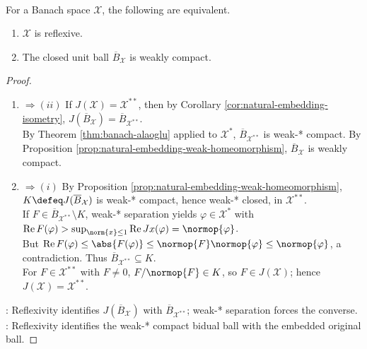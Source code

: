 \begin{theorem} \label{thm:kakutani-reflexivity-weak-compactness} \\
For a Banach space $\mathcal{X}$, the following are equivalent.
\begin{enumerate}[label=(\roman*)]
\setlength{\itemsep}{0pt}
\item $\mathcal{X}$ is reflexive.
\item The closed unit ball $\overline{B}_{\mathcal{X}}$ is weakly compact.
\end{enumerate}
\begin{proof}
\begin{enumerate}[label=\roman*.]
\setlength{\itemsep}{0pt}
\item[$(i)$]$\Rightarrow(ii)$ If $J(\mathcal X)=\mathcal X^{**}$, then by Corollary \ref{cor:natural-embedding-isometry}, $J(\overline{B}_{\mathcal X})=\overline{B}_{\mathcal X^{**}}$.\\
By Theorem \ref{thm:banach-alaoglu} applied to $\mathcal X^*$, $\overline{B}_{\mathcal X^{**}}$ is weak-* compact. By Proposition \ref{prop:natural-embedding-weak-homeomorphism}, $\overline{B}_{\mathcal X}$ is weakly compact.
\item[$(ii)$]$\Rightarrow(i)$ By Proposition \ref{prop:natural-embedding-weak-homeomorphism}, $K\defeq J(\overline{B}_{\mathcal X})$ is weak-* compact, hence weak-* closed, in $\mathcal X^{**}$.\\
If $F\in\overline{B}_{\mathcal X^{**}}\setminus K$, weak-* separation yields $\varphi\in\mathcal X^*$ with $\operatorname{Re}F(\varphi)>\sup_{\norm{x}\leq1}\operatorname{Re}Jx(\varphi)=\normop{\varphi}$.\\
But $\operatorname{Re}F(\varphi)\leq\abs{F(\varphi)}\leq\normop{F}\normop{\varphi}\leq\normop{\varphi}$, a contradiction. Thus $\overline{B}_{\mathcal X^{**}}\subseteq K$.\\
For $F\in\mathcal X^{**}$ with $F\neq0$, $F/\normop{F}\in K$, so $F\in J(\mathcal X)$; hence $J(\mathcal X)=\mathcal X^{**}$.
\end{enumerate}
: Reflexivity identifies $J(\overline{B}_{\mathcal X})$ with $\overline{B}_{\mathcal X^{**}}$; weak-* separation forces the converse.\\
: Reflexivity identifies the weak-* compact bidual ball with the embedded original ball.
\end{proof}
\end{theorem}

